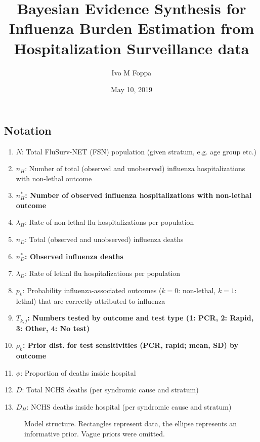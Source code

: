 \documentclass{article}[12pt]
\title{Bayesian Evidence Synthesis for Influenza Burden Estimation from Hospitalization Surveillance data}
\author[1,2,*]{Ivo M Foppa}
\date{May 10, 2019}
\begin{document}
	{\let\newpage\relax\maketitle}	
	\maketitle%
	\subsection*{Notation} 
\begin{enumerate}
	\item $N$: Total FluSurv-NET (FSN) population (given stratum, e.g. age group etc.)
\item $n_H$: Number of total (observed and unobserved) influenza hospitalizations with non-lethal outcome
\item \textbf{$n^\ast_{H}$: Number of observed influenza hospitalizations with non-lethal outcome}
\item $\lambda_H$: Rate of non-lethal flu hospitalizations per population
\item $n_D$: Total (observed and unobserved) influenza deaths
\item\textbf{ $n^\ast_D$: Observed influenza deaths}
\item $\lambda_D$: Rate of lethal flu hospitalizations per population
\item $p_{k}$: Probability influenza-associated outcomes ($k=0$: non-lethal, $k=1$: lethal) that are correctly attributed to influenza
\item\textbf{ $T_{k,j}$: Numbers tested by outcome and test type (1: PCR, 2: Rapid, 3: Other, 4: No test)}
\item \textbf{$\rho_{k}$: Prior dist. for test sensitivities (PCR, rapid; mean, SD) by outcome}
\item $\phi$: Proportion of deaths inside hospital
\item $D$: Total NCHS deaths (per syndromic cause and stratum)
\item $D_H$: NCHS deaths inside hospital (per syndromic cause and stratum)
\end{enumerate}
%
\begin{figure}[h]
	\centering
	\resizebox{.5\textwidth}{!}{
		}
	\caption{Model structure. Rectangles represent data, the ellipse represents an informative prior. Vague priors were omitted.}
	\label{fig2}
\end{figure}
%

\end{document}
